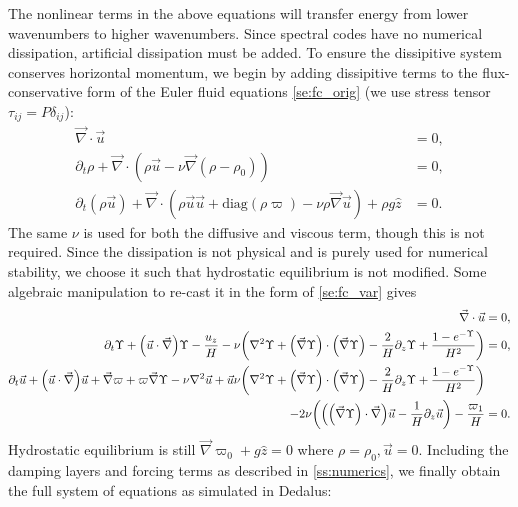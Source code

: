 \documentclass[twocolumn,
        nofootinbib,
        usenames, %
        dvipsnames %
    ]{revtex4-1}%
\DeclarePairedDelimiter\p{\lparen}{\rparen}
\begin{document}
The nonlinear terms in the above equations will transfer energy from lower
wavenumbers to higher wavenumbers. Since spectral codes have no numerical
dissipation, artificial dissipation must be added. To ensure the dissipitive
system conserves horizontal momentum, we begin by adding dissipitive terms to
the flux-conservative form of the Euler fluid equations \autoref{se:fc_orig} (we
use stress tensor $\tau_{ij} = P\delta_{ij}$):
\begin{subequations}
    \begin{align}
        \vec{\nabla} \cdot \vec{u} &= 0,\\
        \partial_t \rho + \vec{\nabla} \cdot (\rho \vec{u} - \nu
            \vec{\nabla}(\rho - \rho_0)) &= 0,\label{eq:visc_cons_mom}\\
        \partial_t (\rho \vec{u}) + \vec{\nabla} \cdot (\rho \vec{u} \vec{u} +
            \mathrm{diag}(\rho \varpi) - \nu \rho \vec{\nabla}\vec{u}) + \rho g
            \hat{z} &= 0.
    \end{align}
\end{subequations}
The same $\nu$ is used for both the diffusive and viscous term, though this is
not required. Since the dissipation is not physical and is purely used for
numerical stability, we choose it such that hydrostatic equilibrium is not
modified. Some algebraic manipulation to re-cast it in the form of
\autoref{se:fc_var} gives
\begin{subequations}
    \begin{align}
        \vec{\nabla} \cdot \vec{u} &= 0,\\
        \partial_t \Upsilon + \p*{\vec{u} \cdot \vec{\nabla}} \Upsilon -
            \frac{u_z}{H} - \nu\p*{\nabla^2 \Upsilon + \p*{\vec{\nabla}
            \Upsilon} \cdot \p*{\vec{\nabla}\Upsilon} - \frac{2}{H}\partial_z
            \Upsilon + \frac{1 - e^{-\Upsilon}}{H^2}} &= 0,\\
        \partial_t \vec{u} + \p*{\vec{u} \cdot \vec{\nabla}}\vec{u} +
            \vec{\nabla} \varpi + \varpi \vec{\nabla} \Upsilon - \nu \nabla^2
            \vec{u} + \vec{u} \nu\p*{\nabla^2 \Upsilon + \p*{\vec{\nabla}
            \Upsilon} \cdot \p*{\vec{\nabla}\Upsilon} - \frac{2}{H}\partial_z
            \Upsilon + \frac{1 - e^{-\Upsilon}}{H^2}}&{}\nonumber\\
        - 2\nu \p*{\p*{\p*{\vec{\nabla}\Upsilon} \cdot \vec{\nabla}}\vec{u} -
            \frac{1}{H}\partial_z \vec{u}} - \frac{\varpi_1}{H} &= 0.
    \end{align}
\end{subequations}
Hydrostatic equilibrium is still $\vec{\nabla} \varpi_0 + g\hat{z} = 0$ where
$\rho = \rho_0, \vec{u} = 0$. Including the damping layers and forcing terms as
described in \autoref{ss:numerics}, we finally obtain the full system of
equations as simulated in Dedalus:
\end{document}
